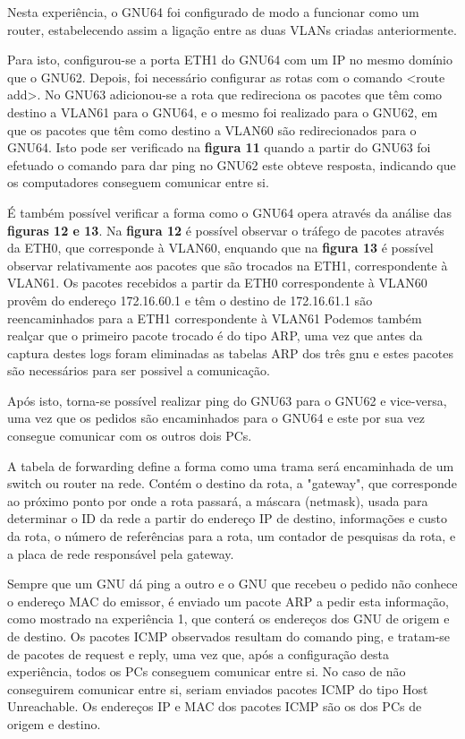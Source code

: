 \documentclass[article, a4paper, 11pt, oneside]{memoir}
\begin{document}
Nesta experiência, o GNU64 foi configurado de modo a funcionar como um router, estabelecendo assim a ligação entre as duas VLANs criadas anteriormente.

Para isto, configurou-se a porta ETH1 do GNU64 com um IP no mesmo domínio que o GNU62. Depois, foi necessário configurar as rotas com o comando <route add>. 
No GNU63 adicionou-se a rota que redireciona os pacotes que têm como destino a VLAN61 para o GNU64, 
e o mesmo foi realizado para o GNU62, em que os pacotes que têm como destino a VLAN60 são redirecionados para o GNU64.
Isto pode ser verificado na \textbf{figura 11} quando a partir do GNU63 foi efetuado o comando para dar ping no GNU62 este obteve resposta, 
indicando que os computadores conseguem comunicar entre si.

É também possível verificar a forma como o GNU64 opera através da análise das \textbf{figuras 12 e 13}. Na \textbf{figura 12} é possível observar o tráfego de 
pacotes através da ETH0, 
que corresponde à VLAN60, enquando que na \textbf{figura 13} é possível observar relativamente aos pacotes que são trocados na ETH1, correspondente à VLAN61. 
Os pacotes recebidos a partir da
ETH0 correspondente à VLAN60 provêm do endereço 172.16.60.1 e têm o destino de 172.16.61.1 são reencaminhados para a ETH1 correspondente à VLAN61
Podemos também realçar que o primeiro pacote trocado é do tipo ARP, uma vez que antes da captura destes logs foram eliminadas as tabelas ARP dos três gnu e estes pacotes são necessários
para ser possivel a comunicação.

Após isto, torna-se possível realizar ping do GNU63 para o GNU62 e vice-versa, uma vez que os pedidos são encaminhados para o GNU64 e este por sua vez consegue comunicar com os outros dois PCs.

A tabela de forwarding define a forma como uma trama será encaminhada de um switch ou router na rede. Contém o destino da rota, a "gateway", que corresponde 
ao próximo ponto por onde a rota passará,
a máscara (netmask), usada para determinar o ID da rede a partir do endereço IP de destino, 
informações e custo da rota, o número de referências para a rota, 
um contador de pesquisas da rota, e a placa de rede responsável pela gateway.

Sempre que um GNU dá ping a outro e o GNU que recebeu o pedido não conhece o endereço MAC do emissor, é enviado um pacote ARP a pedir esta informação, 
como mostrado na experiência 1, que conterá os endereços dos GNU de origem e de destino.
Os pacotes ICMP observados resultam do comando ping, e tratam-se de pacotes de request e reply, uma vez que, após a configuração desta experiência, 
todos os PCs conseguem comunicar entre si.
No caso de não conseguirem comunicar entre si, seriam enviados pacotes ICMP do tipo Host Unreachable.
Os endereços IP e MAC dos pacotes ICMP são os dos PCs de origem e destino.
\end{document}
